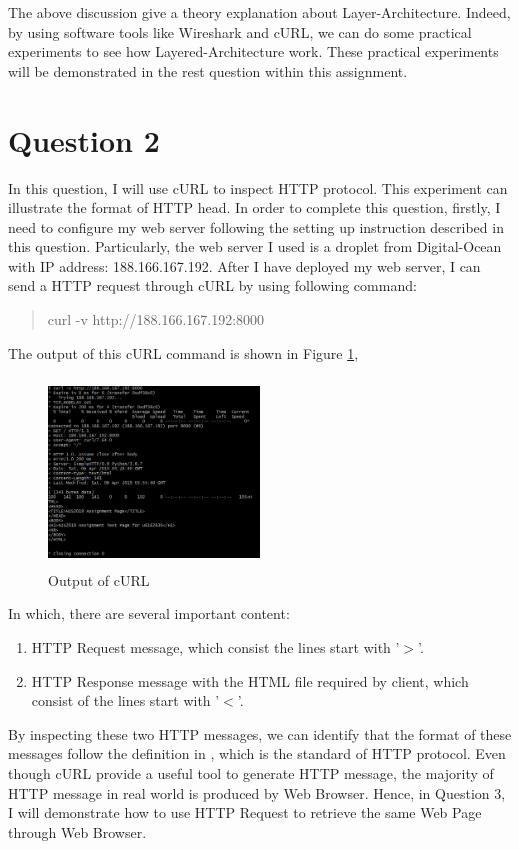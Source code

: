 \documentclass[10pt,a4paper]{article}
\begin{document}
The above discussion give a theory explanation about Layer-Architecture. Indeed, by using software tools like Wireshark and cURL, we can do some practical experiments to see how Layered-Architecture work. These practical experiments will be demonstrated in the rest question within this assignment.

\section*{Question 2}
In this question, I will use cURL to inspect HTTP protocol. This experiment can illustrate the format of HTTP head. In order to complete this question, firstly, I need to configure my web server following the setting up instruction described in this question. Particularly, the web server I used is a droplet from Digital-Ocean with IP address: 188.166.167.192. After I have deployed my web server, I can send a HTTP request through cURL by using following command:
\begin{quote}
	\center
	curl -v http://188.166.167.192:8000
\end{quote} 
The output of this cURL command is shown in Figure \ref{co},
\begin{figure}[ht]
	\center
	\includegraphics[width = 0.5\textwidth, height = 5cm]{cURL_1}
	\caption{Output of cURL}
	\label{co}
\end{figure}
In which, there are several important content:
\begin{enumerate}
	\item HTTP Request message, which consist the lines start with '$>$'.
	\item HTTP Response message with the HTML file required by client, which consist of the lines start with '$<$'.
\end{enumerate}
By inspecting these two HTTP messages, we can identify that the format of these messages follow the definition in \cite{rfc2616}, which is the standard of HTTP protocol. Even though cURL provide a useful tool to generate HTTP message, the majority of HTTP message in real world is produced by Web Browser. Hence, in Question 3, I will demonstrate how to use HTTP Request to retrieve the same Web Page through Web Browser.
\end{document}
